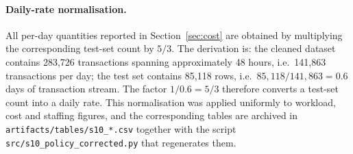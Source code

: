 \paragraph{Daily-rate normalisation.} All per-day quantities reported in
Section~\ref{sec:cost} are obtained by multiplying the corresponding test-set
count by $5/3$. The derivation is: the cleaned dataset contains 283{,}726
transactions spanning approximately 48 hours, i.e.\ 141{,}863 transactions per
day; the test set contains 85{,}118 rows, i.e.\ $85{,}118 / 141{,}863 = 0.6$
days of transaction stream. The factor $1/0.6 = 5/3$ therefore converts a
test-set count into a daily rate. This normalisation was applied uniformly to
workload, cost and staffing figures, and the corresponding tables are archived
in \texttt{artifacts/tables/s10\_*.csv} together with the script
\texttt{src/s10\_policy\_corrected.py} that regenerates them.
